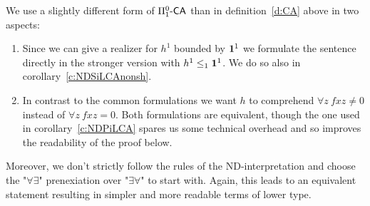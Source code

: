 \begin{rmk}
We use a slightly different form of $\Pi^0_1\textsf{\upshape -}\textsf{\upshape CA}$ than in definition~\ref{d:CA} above in two aspects:
\begin{enumerate}
\item Since we can give a realizer for $h^1$ bounded by $\mathbf1^1$
we formulate the sentence directly in the stronger version with $h^1\leq_1\mathbf1^1$. We do so also in
corollary~\ref{c:NDSiLCAnonsh}.
\item In contrast to the common formulations we want $h$ to comprehend $\forall z\ fxz\neq 0$ instead of
$\forall z\ fxz= 0$. Both formulations are equivalent, though the one used in corollary~\ref{c:NDPiLCA}
spares us some technical overhead and so improves the readability of the proof below.
\end{enumerate}
Moreover, we don't strictly follow the rules of the ND-interpretation and choose the "$\forall\exists$"
prenexiation over "$\exists\forall$" to start with. Again, this leads to an equivalent statement resulting in simpler
and more readable terms of lower type.
\end{rmk}

